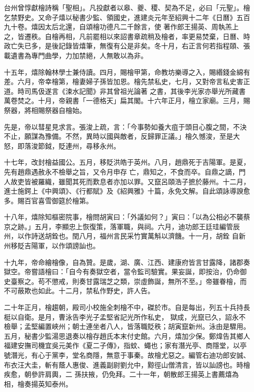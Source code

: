 \begin{pinyinscope}
 台州曾惇獻檜詩稱「聖相」。凡投獻者以皋、夔、稷、契為不足，必曰「元聖」。檜乞禁野史。又命子熺以秘書少監、領國史，進建炎元年至紹興十二年《日曆》五百九十卷。熺因太后北還，自頌檜功德凡二千餘言，使
 著作郎王揚英、周執羔上之，皆遷秩。自檜再相，凡前罷相以來詔書章疏稍及檜者，率更易焚棄，日曆、時政亡失已多，是後記錄皆熺筆，無復有公是非矣。冬十月，右正言何若指程頤、張載遺書為專門曲學，力加禁絕，人無敢以為非。



 十五年，熺除翰林學士兼侍讀。四月，賜檜甲第，命教坊樂導之入，賜緡錢金綿有差。六月，帝幸檜第，檜妻婦子孫皆加恩。檜先禁私史，七月，又對帝言私史害正道。時司馬伋遂言《涑水記聞》非其曾祖光論著
 之書，其後李光家亦舉光所藏書萬卷焚之。十月，帝親書「一德格天」扁其閣。十六年正月，檜立家廟。三月，賜祭器，將相賜祭器自檜始。



 先是，帝以彗星見求言。張浚上疏，言：「今事勢如養大疽于頭目心腹之間，不決不止，願謀為豫備。不然，異時以國與敵者，反歸罪正議。」檜久憾浚，至是大怒，即落浚節鉞，貶連州，尋移永州。



 十七年，改封檜益國公。五月，移貶洪皓于英州。八月，趙鼎死于吉陽軍。是夏，先有趙鼎遇赦永不檢舉之旨，又令月申存
 亡，鼎知之，不食而卒。自鼎之謫，門人故吏皆被羅織，雖聞其死而歎息者亦加以罪。又竄呂頤浩子摭於藤州。十二月，進士施鍔上《中興頌》、《行都賦》及《紹興雅》十篇，永免文解。自此頌詠導諛愈多。賜百官喜雪御筵於檜第。



 十八年，熺除知樞密院事，檜問胡寅曰：「外議如何？」寅曰：「以為公相必不襲蔡京之跡。」五月，李顯忠上恢復策，落軍職，與祠。六月，迪功郎王廷珪編管辰州，以作詩送胡銓也。閏八月，福州言民采竹實萬斛以濟饑。十一月，胡銓
 自新州移貶吉陽軍，以作頌謗訕也。



 十九年，帝命繪檜像，自為贊。是歲，湖、廣、江西、建康府皆言甘露降，諸郡奏獄空。帝嘗語檜曰：「自今有奏獄空者，當令監司驗實。果妄誕，即按治，仍命御史臺察之。苟不懲戒，則奏甘露瑞芝之類，崇虛飾誕，無所不至。」帝雖眷檜，而不可蔽欺也如此。十二月，禁私作野史，許人告。



 二十年正月，檜趨朝，殿司小校施全刺檜不中，磔於市。自是每出，列五十兵持長梃以自衛。是月，曹泳告李光子孟堅省記光所作私史，
 獄成，光竄已久，詔永不檢舉；孟堅編置峽州；朝士連坐者八人，皆落職貶秩；胡寅竄新州。泳由是驟用。五月，秘書少監湯思退奏以檜存趙氏本末付史館。六月，熺加少保。鄭煒告其鄉人福建安撫司機宜吳元美作《夏二子傳》，指蚊、蠅也；家有潛光亭、商隱堂，以亭號潛光，有心于黨李，堂名商隱，無意于事秦。故檜尤惡之。編管右迪功郎安誠、布衣汪大圭，斬有蔭人惠俊、進義副尉劉允中，黥徑山僧清言，皆以訕謗也。時檜疾愈，朝參許肩輿，二
 孫扶掖，仍免拜。二十一年，朝散郎王揚英上書薦熺為相，檜奏揚英知泰州。




\end{pinyinscope}
